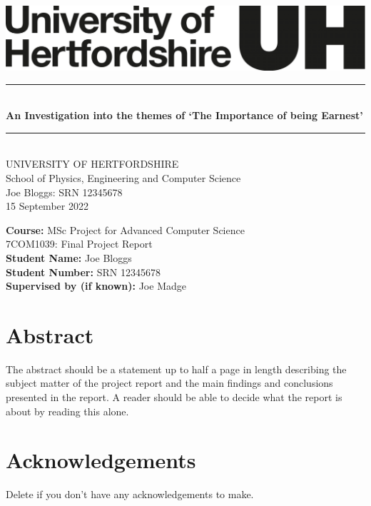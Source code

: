 \documentclass[a4paper, notitlepage, 11pt]{article}
\newcommand{\projecttitle}{An Investigation into the themes of `The Importance of being Earnest'}
\newcommand{\studentname}{Joe Bloggs}
\newcommand{\studentnumber}{SRN 12345678}
\newcommand{\supervisorname}{Joe Madge}
\newcommand{\HRule}{\rule{\linewidth}{0.5mm}}
\newcommand{\doctype}{Final Project Report}
\newcommand{\coursecode}{7COM1039}
\newcommand{\moduletitle}{Advanced Computer Science}
\newcommand{\reportdate}{15 September 2022}
\begin{document}
\thispagestyle{empty} %
\begin{center}
    \vspace{2cm}
    \includegraphics[scale=0.2]{herts-logo-black.png} \\[5cm]
    
    \HRule \\[0.4cm]
    \huge{ \bfseries \projecttitle \\[0.15cm] }
    \HRule \\[1.5cm]
    
    \textsf{\LARGE{UNIVERSITY OF HERTFORDSHIRE\\
    School of Physics, Engineering and Computer Science} \\[2cm]}
    \LARGE{\studentname \enspace : \enspace \studentnumber}\\
    \large{\reportdate } \\[3cm]
    
\end{center}

\large{\textbf{Course: }MSc Project for \moduletitle\\
        \coursecode \enspace : \enspace \doctype \\
    \textbf{Student Name:} \studentname \\
    \textbf{Student Number:} \studentnumber \\
    \textbf{Supervised by (if known):} \supervisorname 
}
\clearpage
\setcounter{page}{1}
\setcounter{tocdepth}{2}

\section*{Abstract}
The abstract should be a statement up to half a page in length describing the subject matter of 
the  project  report  and  the  main  findings  and  conclusions  presented  in  the  report.  A  reader should be able to decide what the report is about by reading this alone.  

\section*{Acknowledgements}
Delete if you don't have any acknowledgements to make.
\end{document}
